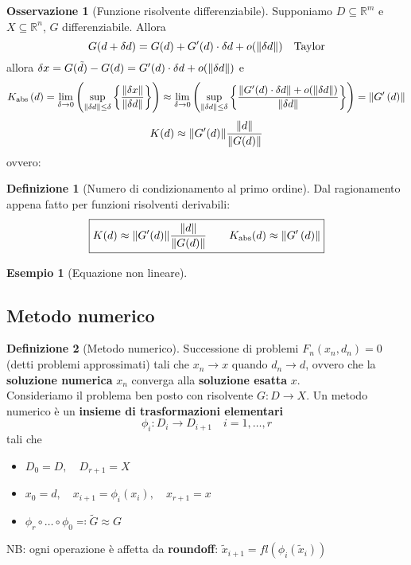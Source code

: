 \documentclass[a4paper,10pt]{article}
\theoremstyle{definition}
\newcommand{\re}{\mathbb{R}} %
\theoremstyle{indentdefinition}
\newtheorem{defn}{Definizione}[section]
\theoremstyle{indenttheorem}
\theoremstyle{myremark}
\newtheorem*{rem*}{Osservazione}
\newtheorem{example*}{Esempio}
\theoremstyle{indentgeneral}
\theoremstyle{plain}
\theoremstyle{plain}
\begin{document}
\begin{rem*}[Funzione risolvente differenziabile]
    Supponiamo $D\subseteq \re^m$ e $X\subseteq\re^n$, $G$ differenziabile. Allora
    $$G(d+\delta d)=G(d)+G'(d)\cdot\delta d+o(\norm{\delta d}) \quad \text{Taylor}$$
    allora $\delta x=G(\tilde{d})-G(d)=G'(d)\cdot\delta d+o(\norm{\delta d})$ e 
    $${K}_{\text{abs}}\left(d\right)=\lim_{\delta\rightarrow0}\left(\sup_{\left\Vert \delta d\right\Vert \leq\delta}\left\{ \frac{\left\Vert \delta x\right\Vert }{\left\Vert \delta d\right\Vert }\right\} \right)\approx\lim_{\delta\rightarrow0}\left(\sup_{\left\Vert \delta d\right\Vert \leq\delta}\left\{ \frac{\norm{G'(d)\cdot\delta d}+o(\norm{\delta d})}{\left\Vert \delta d\right\Vert }\right\} \right)
    =\left\Vert G'\left(d\right)\right\Vert$$
    $$K(d)\approx \norm{G'(d)}\frac{\norm{d}}{\norm{G(d)}}$$
    ovvero:
\end{rem*}

\begin{defn}[Numero di condizionamento al primo ordine] Dal ragionamento appena fatto per funzioni risolventi derivabili:
     $$\boxed{K(d)\approx \norm{G'(d)}\frac{\norm{d}}{\norm{G(d)}}  \quad \quad  {K}_{\text{abs}}(d)\approx\left\Vert G'\left(d\right)\right\Vert}$$
\end{defn}

\begin{example*}[Equazione non lineare]
    
\end{example*}
\subsection{Metodo numerico}
\begin{defn}[Metodo numerico]
Successione di problemi $F_{n}\left(x_{n},d_{n}\right)=0$ (detti problemi approssimati)
tali che $x_{n}\rightarrow x$ quando $d_{n}\rightarrow d$, ovvero che la \textbf{soluzione numerica} $x_n$ converga alla \textbf{soluzione esatta} $x$.\\
Consideriamo il problema ben posto con risolvente $G:D\to X$. Un metodo numerico è un \textbf{insieme di trasformazioni elementari} 
$$\phi_i:D_i\to D_{i+1} \quad i=1,\dots, r$$
tali che
\begin{itemize}
    \item $D_0=D, \quad D_{r+1}=X$
    \item $x_0=d, \quad x_{i+1}=\phi_i(x_i),\quad x_{r+1}=x$
    \item $\phi_r\circ\dots\circ\phi_0\eqqcolon \widetilde{G}\approx G$
\end{itemize}
NB: ogni operazione è affetta da \textbf{roundoff}: $\tilde{x}_{i+1}=fl(\phi_i(\tilde{x}_i))$
\end{defn}
\end{document}
